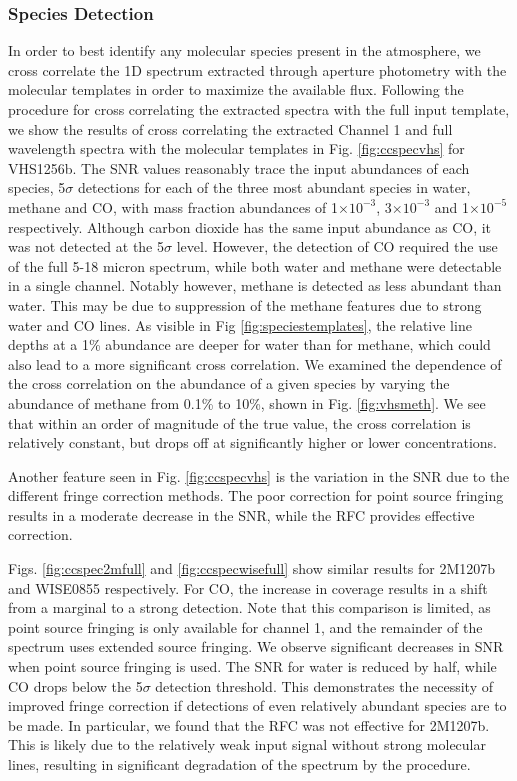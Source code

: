 \subsubsection{Species Detection}
In order to best identify any molecular species present in the atmosphere, we cross correlate the 1D spectrum extracted through aperture photometry with the molecular templates in order to maximize the available flux.
Following the procedure for cross correlating the extracted spectra with the full input template, we show the results of cross correlating the extracted Channel 1 and full wavelength spectra with the molecular templates in Fig. \ref{fig:ccspecvhs} for VHS1256b.
The SNR values reasonably trace the input abundances of each species, 5$\sigma$ detections for each of the three most abundant species in water, methane and CO, with mass fraction abundances of 1$\times10^{-3}$, 3$\times10^{-3}$ and 1$\times10^{-5}$ respectively. 
Although carbon dioxide has the same input abundance as CO, it was not detected at the 5$\sigma$ level.
However, the detection of CO required the use of the full 5-18 micron spectrum, while both water and methane were detectable in a single channel.
Notably however, methane is detected as less abundant than water. 
This may be due to suppression of the methane features due to strong water and CO lines. 
As visible in Fig \ref{fig:speciestemplates}, the relative line depths at a 1\% abundance are deeper for water than for methane, which could also lead to a more significant cross correlation.
We examined the dependence of the cross correlation on the abundance of a given species by varying the abundance of methane from 0.1\% to 10\%, shown in Fig. \ref{fig:vhsmeth}.
We see that within an order of magnitude of the true value, the cross correlation is relatively constant, but drops off at significantly higher or lower concentrations.

Another feature seen in Fig. \ref{fig:ccspecvhs} is the variation in the SNR due to the different fringe correction methods. 
The poor correction for point source fringing results in a moderate decrease in the SNR, while the RFC provides effective correction.

Figs. \ref{fig:ccspec2mfull} and \ref{fig:ccspecwisefull} show similar results for 2M1207b and WISE0855 respectively. 
For CO, the increase in coverage results in a shift from a marginal to a strong detection.
Note that this comparison is limited, as point source fringing is only available for channel 1, and the remainder of the spectrum uses extended source fringing.
We observe significant decreases in SNR when point source fringing is used.
The SNR for water is reduced by half, while CO drops below the 5$\sigma$ detection threshold.
This demonstrates the necessity of improved fringe correction if detections of even relatively abundant species are to be made.
In particular, we found that the RFC was not effective for 2M1207b. 
This is likely due to the relatively weak input signal without strong molecular lines, resulting in significant degradation of the spectrum by the procedure.

